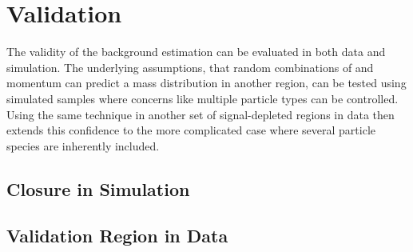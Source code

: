 
\section{Validation}

The validity of the background estimation can be evaluated in both data and simulation.
The underlying assumptions, that random combinations of \dedx and momentum can predict a mass distribution in another region, can be tested using simulated samples where concerns like multiple particle types can be controlled.
Using the same technique in another set of signal-depleted regions in data then extends this confidence to the more complicated case where several particle species are inherently included.

\subsection{Closure in Simulation}

\subsection{Validation Region in Data}

